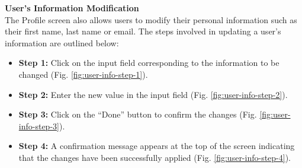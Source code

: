 \vspace{10mm}

\noindent \textbf{User's Information Modification} \\
The Profile screen also allows users to modify their personal information such as their first name, last name or email. The steps involved in updating a user's information are outlined below:

\begin{itemize}
    \item \textbf{Step 1:} Click on the input field corresponding to the information to be changed (Fig. \ref{fig:user-info-step-1}).
    \item \textbf{Step 2:} Enter the new value in the input field (Fig. \ref{fig:user-info-step-2}).
    \item \textbf{Step 3:} Click on the ``Done'' button to confirm the changes (Fig. \ref{fig:user-info-step-3}).
    \item \textbf{Step 4:} A confirmation message appears at the top of the screen indicating that the changes have been successfully applied (Fig. \ref{fig:user-info-step-4}).
\end{itemize}

\vspace{5mm}

